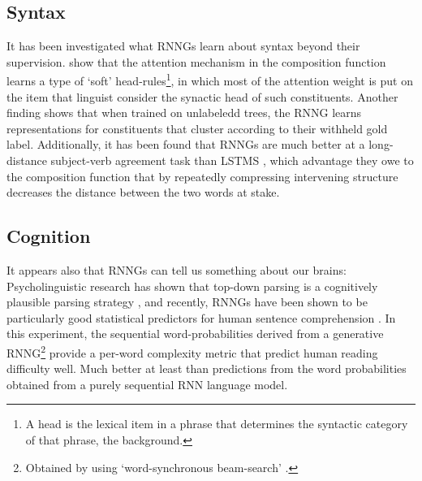\subsection{Syntax} It has been investigated what RNNGs learn about syntax beyond their supervision. \citet{kuncoro2017syntax} show that the attention mechanism in the composition function learns a type of `soft' head-rules\footnote{A head is the lexical item in a phrase that determines the syntactic category of that phrase, \cf the background.}, in which most of the attention weight is put on the item that linguist consider the synactic head of such constituents. Another finding shows that when trained on unlabeledd trees, the RNNG learns representations for constituents that cluster according to their withheld gold label. Additionally, it has been found that RNNGs are much better at a long-distance subject-verb agreement task than LSTMS \citep{linzen2016syntax,kuncoro2018learn}, which advantage they owe to the composition function that by repeatedly compressing intervening structure decreases the distance between the two words at stake.

\subsection{Cognition} It appears also that RNNGs can tell us something about our brains: Psycholinguistic research has shown that top-down parsing is a cognitively plausible parsing strategy \citep{brennan2016abstract}, and recently, RNNGs have been shown to be particularly good statistical predictors for human sentence comprehension \citep{hale2018beam}. In this experiment, the sequential word-probabilities derived from a generative RNNG\footnote{Obtained by using `word-synchronous beam-search' \citep{stern2017beam}.} provide a per-word complexity metric that predict human reading difficulty well. Much better at least than predictions from the word probabilities obtained from a purely sequential RNN language model.

